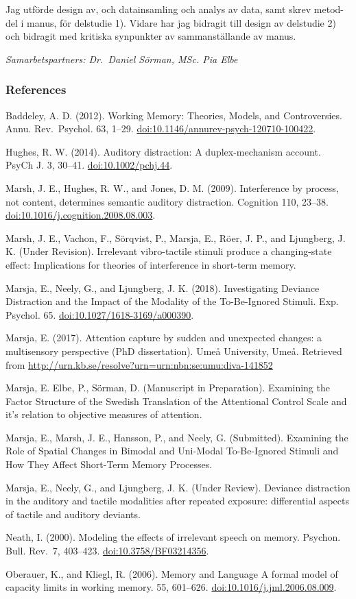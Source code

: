\documentclass[]{article}
\begin{document}
Jag utförde design av, och datainsamling och analys av data, samt skrev
metod-del i manus, för delstudie 1). Vidare har jag bidragit till design
av delstudie 2) och bidragit med kritiska synpunkter av sammanställande
av manus.

\emph{Samarbetspartners: Dr.~Daniel Sörman, MSc. Pia Elbe}

\newpage

\subsubsection{References}\label{references}

Baddeley, A. D. (2012). Working Memory: Theories, Models, and
Controversies. Annu. Rev.~Psychol. 63, 1--29.
\url{doi:10.1146/annurev-psych-120710-100422}.

Hughes, R. W. (2014). Auditory distraction: A duplex-mechanism account.
PsyCh J. 3, 30--41. \url{doi:10.1002/pchj.44}.

Marsh, J. E., Hughes, R. W., and Jones, D. M. (2009). Interference by
process, not content, determines semantic auditory distraction.
Cognition 110, 23--38. \url{doi:10.1016/j.cognition.2008.08.003}.

Marsh, J. E., Vachon, F., Sörqvist, P., Marsja, E., Röer, J. P., and
Ljungberg, J. K. (Under Revision). Irrelevant vibro-tactile stimuli
produce a changing-state effect: Implications for theories of
interference in short-term memory.

Marsja, E., Neely, G., and Ljungberg, J. K. (2018). Investigating
Deviance Distraction and the Impact of the Modality of the To-Be-Ignored
Stimuli. Exp. Psychol. 65. \url{doi:10.1027/1618-3169/a000390}.

Marsja, E. (2017). Attention capture by sudden and unexpected changes: a
multisensory perspective (PhD dissertation). Umeå University, Umeå.
Retrieved from
\url{http://urn.kb.se/resolve?urn=urn:nbn:se:umu:diva-141852}

Marsja, E. Elbe, P., Sörman, D. (Manuscript in Preparation). Examining
the Factor Structure of the Swedish Translation of the Attentional
Control Scale and it's relation to objective measures of attention.

Marsja, E., Marsh, J. E., Hansson, P., and Neely, G. (Submitted).
Examining the Role of Spatial Changes in Bimodal and Uni-Modal
To-Be-Ignored Stimuli and How They Affect Short-Term Memory Processes.

Marsja, E., Neely, G., and Ljungberg, J. K. (Under Review). Deviance
distraction in the auditory and tactile modalities after repeated
exposure: differential aspects of tactile and auditory deviants.

Neath, I. (2000). Modeling the effects of irrelevant speech on memory.
Psychon. Bull. Rev.~7, 403--423. \url{doi:10.3758/BF03214356}.

Oberauer, K., and Kliegl, R. (2006). Memory and Language A formal model
of capacity limits in working memory. 55, 601--626.
\url{doi:10.1016/j.jml.2006.08.009}.
\end{document}

